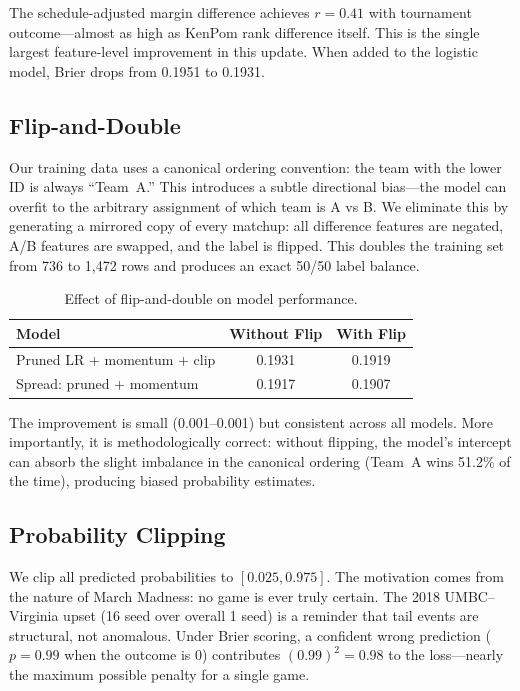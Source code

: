 \documentclass[11pt,a4paper]{article}
\begin{document}
The schedule-adjusted margin difference achieves $r = 0.41$ with tournament outcome---almost as high as KenPom rank difference itself. This is the single largest feature-level improvement in this update. When added to the logistic model, Brier drops from 0.1951 to 0.1931.


\subsection{Flip-and-Double}

Our training data uses a canonical ordering convention: the team with the lower ID is always ``Team~A.'' This introduces a subtle directional bias---the model can overfit to the arbitrary assignment of which team is A vs B. We eliminate this by generating a mirrored copy of every matchup: all difference features are negated, A/B features are swapped, and the label is flipped. This doubles the training set from 736 to 1,472 rows and produces an exact 50/50 label balance.

\begin{table}[h]
\centering
\caption{Effect of flip-and-double on model performance.}
\label{tab:flip}
\small
\begin{tabular}{@{}lcc@{}}
\toprule
\textbf{Model} & \textbf{Without Flip} & \textbf{With Flip} \\
\midrule
Pruned LR + momentum + clip & 0.1931 & 0.1919 \\
Spread: pruned + momentum & 0.1917 & 0.1907 \\
\bottomrule
\end{tabular}
\end{table}

The improvement is small (0.001--0.001) but consistent across all models. More importantly, it is methodologically correct: without flipping, the model's intercept can absorb the slight imbalance in the canonical ordering (Team~A wins 51.2\% of the time), producing biased probability estimates.


\subsection{Probability Clipping}

We clip all predicted probabilities to $[0.025, 0.975]$. The motivation comes from the nature of March Madness: no game is ever truly certain. The 2018 UMBC--Virginia upset (16 seed over overall 1 seed) is a reminder that tail events are structural, not anomalous. Under Brier scoring, a confident wrong prediction ($p = 0.99$ when the outcome is 0) contributes $(0.99)^2 = 0.98$ to the loss---nearly the maximum possible penalty for a single game.
\end{document}
